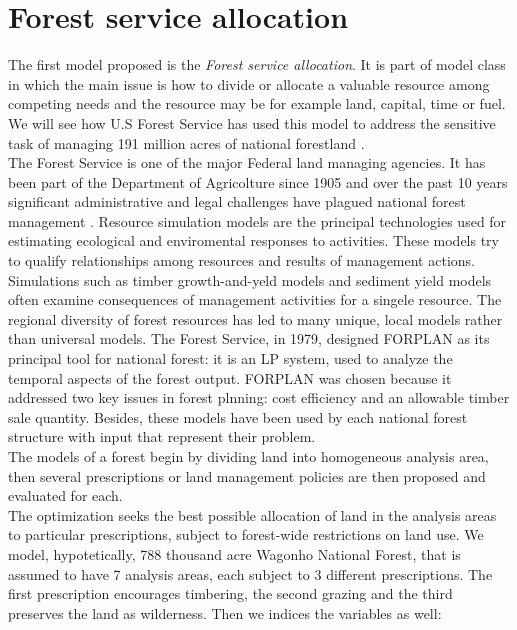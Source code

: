 \documentclass[a4paper,10 pt,titlepage,twoside]{book}
\theoremstyle{plain}
\theoremstyle{definition}
\theoremstyle{remark}
\begin{document}
\section{Forest service allocation} 
The first model proposed is the \textit{Forest service allocation}. It is part of model class in which the main issue is how to divide or allocate a valuable resource among competing needs and the resource may be for example land, capital, time or fuel. We will see how U.S Forest Service has used this model to address the sensitive task of managing 191 million acres of national forestland \cite{(Natural)}.\\
The Forest Service is one of the major Federal land managing agencies. It has been part of the Department of Agricolture since 1905 and over the past 10 years significant administrative and legal challenges have plagued national forest management \cite{ForSer}. Resource simulation models are the principal technologies used for estimating ecological and enviromental responses to activities. These models try to qualify relationships among resources and results of management actions. Simulations such as timber growth-and-yeld models and sediment yield models often examine consequences of management activities for a singele resource. The regional diversity of forest resources has led to many unique, local models rather than universal models. The Forest Service, in 1979, designed FORPLAN as its principal tool for national forest: it is an LP system, used to analyze the temporal aspects of the forest output. FORPLAN was chosen because it addressed two key issues in forest plnning: cost efficiency and an allowable timber sale quantity. Besides, these models have been used by each national forest structure with input that represent their problem.\\
The models of a forest begin by dividing land into homogeneous analysis area, then several prescriptions or land management policies are then proposed and evaluated for each. \\The optimization seeks the best possible allocation of land in the analysis areas to particular prescriptions, subject to forest-wide restrictions on land use.
We model, hypotetically, 788 thousand acre Wagonho National Forest, that is assumed to have 7 analysis areas, each subject to 3 different prescriptions. The first prescription encourages timbering, the second grazing and the third preserves the land as wilderness. Then we indices the variables as well:
\end{document}
